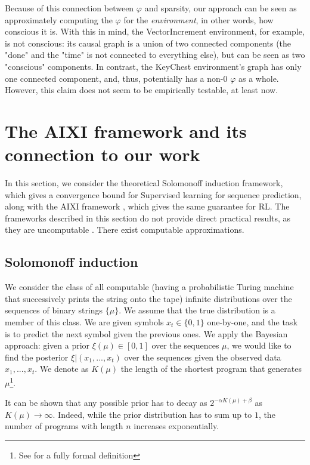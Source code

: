 \documentclass[a4paper,11pt,oneside]{report}
\begin{document}
Because of this connection between $\varphi$ and sparsity, our approach can be seen as approximately computing the $\varphi$ for the {\em environment}, in other words, how conscious it is. With this in mind, the VectorIncrement environment, for example, is not conscious: its causal graph is a union of two connected components (the "done" and the "time" is not connected to everything else), but can be seen as two "conscious" components. In contrast, the KeyChest environment's graph has only one connected component, and, thus, potentially has a non-$0$ $\varphi$ as a whole. However, this claim does not seem to be empirically testable, at least now.

\section{The AIXI framework and its connection to our work}
\label{sec:solomonoff_aixi}
In this section, we consider the theoretical Solomonoff induction framework, which gives a convergence bound for Supervised learning for sequence prediction, along with the AIXI framework \cite{Hutter2003,legg2008machine}, which gives the same guarantee for RL. The frameworks described in this section do not provide direct practical results, as they are uncomputable \cite{Hutter2003}. There exist computable approximations\cite{Veness2010}.

\subsection{Solomonoff induction}
\label{subsec:solomonoff}
We consider the class of all computable (having a probabilistic Turing machine that successively prints the string onto the tape) infinite distributions over the sequences of binary strings $\{\mu\}$. We assume that the true distribution is a member of this class. We are given symbols $x_t\in \{0,1\}$ one-by-one, and the task is to predict the next symbol given the previous ones. We apply the Bayesian approach: given a prior $\xi(\mu)\in[0,1]$ over the sequences $\mu$, we would like to find the posterior $\xi|(x_1,...,x_t)$ over the sequences given the observed data $x_1,...,x_t$. We denote as $K(\mu)$ the length of the shortest program that generates $\mu$\footnote{See \cite{Hutter2003} for a fully formal definition}.

It can be shown \cite{Hoang2020,Citation2021} that any possible prior has to decay as $2^{-\alpha K(\mu)+\beta}$ as $K(\mu)\to\infty$. Indeed, while the prior distribution has to sum up to $1$, the number of programs with length $n$ increases exponentially.
\end{document}
